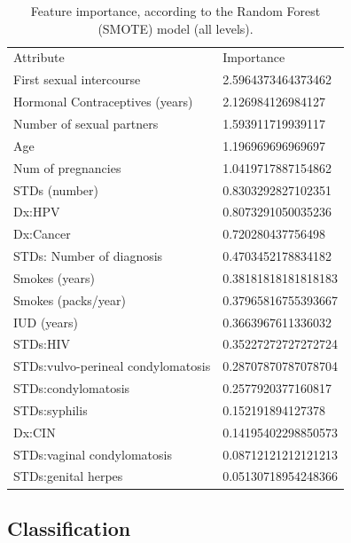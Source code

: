 \begin{table}[]
\begin{tabular}{ll}
Attribute                          & Importance          \\
First sexual intercourse           & 2.5964373464373462  \\
Hormonal Contraceptives (years)    & 2.126984126984127   \\
Number of sexual partners          & 1.593911719939117   \\
Age                                & 1.196969696969697   \\
Num of pregnancies                 & 1.0419717887154862  \\
STDs (number)                      & 0.8303292827102351  \\
Dx:HPV                             & 0.8073291050035236  \\
Dx:Cancer                          & 0.720280437756498   \\
STDs: Number of diagnosis          & 0.4703452178834182  \\
Smokes (years)                     & 0.38181818181818183 \\
Smokes (packs/year)                & 0.37965816755393667 \\
IUD (years)                        & 0.3663967611336032  \\
STDs:HIV                           & 0.35227272727272724 \\
STDs:vulvo-perineal condylomatosis & 0.28707870787078704 \\
STDs:condylomatosis                & 0.2577920377160817  \\
STDs:syphilis                      & 0.152191894127378   \\
Dx:CIN                             & 0.14195402298850573 \\
STDs:vaginal condylomatosis        & 0.08712121212121213 \\
STDs:genital herpes                & 0.05130718954248366
\end{tabular}
\caption{Feature importance, according to the Random Forest (SMOTE) model (all levels).}
\label{table:feature_importance}

\end{table}

\subsection{Classification}


